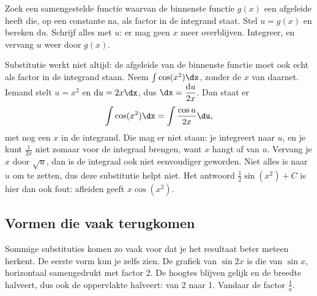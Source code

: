 
\begin{werkwijze}
Zoek een samengestelde functie waarvan de binnenste functie $g(x)$ een afgeleide heeft die, op een constante na, als factor in de integrand staat. Stel $u = g(x)$ en bereken $\mathrm{d}u$. Schrijf alles met $u$: er mag geen $x$ meer overblijven. Integreer, en vervang $u$ weer door $g(x)$.
\end{werkwijze}


\begin{oefeningen}
\end{oefeningen}

Substitutie werkt niet altijd: de afgeleide van de binnenste functie moet ook echt als factor in de integrand staan. Neem $\int \cos(x^2)\dx$, zonder de $x$ van daarnet. Iemand stelt $u = x^2$ en $\mathrm{d}u = 2x\dx$, dus $\dx = \dfrac{\mathrm{d}u}{2x}$. Dan staat er
\[ \int \cos(x^2)\dx = \int \frac{\cos u}{2x}\du , \]
met nog een $x$ in de integrand. Die mag er niet staan: je integreert naar $u$, en je kunt $\tfrac{1}{2x}$ niet zomaar voor de integraal brengen, want $x$ hangt af van $u$. Vervang je $x$ door $\sqrt{u}$, dan is de integraal ook niet eenvoudiger geworden. Niet alles is naar $u$ om te zetten, dus deze substitutie helpt niet. Het antwoord $\tfrac12\sin(x^2) + C$ is hier dan ook fout: afleiden geeft $x\cos(x^2)$.

\subsection{Vormen die vaak terugkomen}

Sommige substituties komen zo vaak voor dat je het resultaat beter meteen herkent. De eerste vorm kun je zelfs zien. De grafiek van $\sin 2x$ is die van $\sin x$, horizontaal samengedrukt met factor 2. De hoogtes blijven gelijk en de breedte halveert, dus ook de oppervlakte halveert: van 2 naar 1. Vandaar de factor $\tfrac{1}{a}$.

